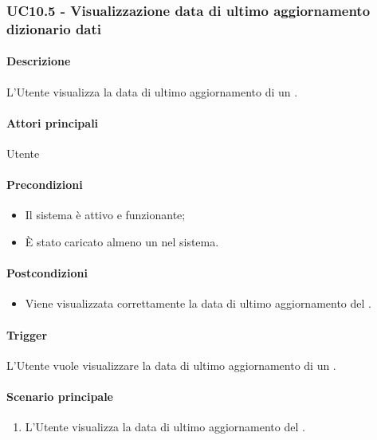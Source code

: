 \subsubsection{UC10.5 - Visualizzazione data di ultimo aggiornamento dizionario dati}\label{UC10point5}
\paragraph*{Descrizione}
L'Utente visualizza la data di ultimo aggiornamento di un .

\paragraph*{Attori principali}
Utente

\paragraph*{Precondizioni}
\begin{itemize}
  \item Il sistema è attivo e funzionante;
  \item È stato caricato almeno un  nel sistema. 
\end{itemize}

\paragraph*{Postcondizioni}
\begin{itemize}
  \item Viene visualizzata correttamente la data di ultimo aggiornamento del .
\end{itemize}

\paragraph*{Trigger}
L'Utente vuole visualizzare la data di ultimo aggiornamento di un .

\paragraph*{Scenario principale}
\begin{enumerate}
  \item L'Utente visualizza la data di ultimo aggiornamento del .
\end{enumerate}